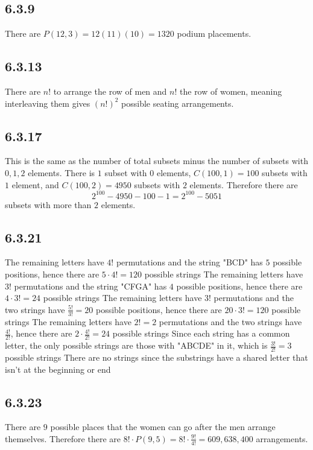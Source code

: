 \documentclass[12pt,titlepage]{extarticle}
\begin{document}
\subsection*{6.3.9}
There are $P(12, 3) = 12(11)(10) = 1320$ podium placements.

\subsection*{6.3.13}
There are $n!$ to arrange the row of men and $n!$ the row of women, meaning interleaving them gives $(n!)^2$ possible seating arrangements.

\subsection*{6.3.17}
This is the same as the number of total subsets minus the number of subsets with $0,1,2$ elements. There is $1$ subset with $0$ elements, $C(100, 1) = 100$ subsets with $1$ element, and $C(100,2) = 4950$ subsets with $2$ elements. Therefore there are
\[
    2^{100} - 4950 - 100 - 1 = 2^{100} - 5051
\]
subsets with more than $2$ elements.

\subsection*{6.3.21}
\begin{tasks}
    \task The remaining letters have $4!$ permutations and the string "BCD" has $5$ possible positions, hence there are $5\cdot 4! = 120$ possible strings
    \task The remaining letters have $3!$ permutations and the string "CFGA" has $4$ possible positions, hence there are $4 \cdot 3! = 24$ possible strings
    \task The remaining letters have $3!$ permutations and the two strings have $\frac{5!}{3!} = 20$ possible positions, hence there are $20 \cdot 3! = 120$ possible strings
    \task The remaining letters have $2! = 2$ permutations and the two strings have $\frac{4!}{2!}$, hence there are $2 \cdot \frac{4!}{2!} = 24$ possible strings
    \task Since each string has a common letter, the only possible strings are those with "ABCDE" in it, which is $\frac{3!}{2!} = 3$ possible strings
    \task There are no strings since the substrings have a shared letter that isn't at the beginning or end
\end{tasks}

\subsection*{6.3.23}
There are $9$ possible places that the women can go after the men arrange themselves. Therefore there are $8! \cdot P(9,5) = 8! \cdot \frac{9!}{4!} = 609,638,400$ arrangements.
\end{document}
